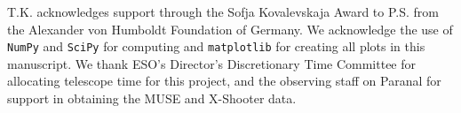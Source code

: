 \documentclass[traditabstract]{aa}
\begin{document}
\begin{acknowledgements}

T.K. acknowledges support through the Sofja Kovalevskaja Award to P.S. from the Alexander von Humboldt Foundation of Germany.  We acknowledge the use of \texttt{NumPy} and \texttt{SciPy} \citep{Walt:2011:NAS:1957373.1957466} for computing and \texttt{matplotlib} \citep{Hunter:2007} for creating all plots in this manuscript. We thank ESO's Director's Discretionary Time Committee for allocating telescope time for this project, and the observing staff on Paranal for support in obtaining the MUSE and X-Shooter data.

\end{acknowledgements}






\end{document}
